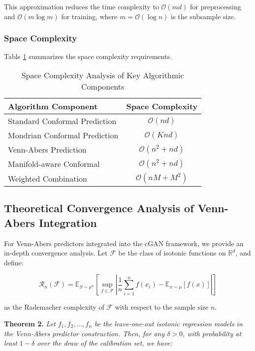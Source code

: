 \documentclass{article}
\theoremstyle{plain}
\theoremstyle{definition}
\theoremstyle{remark}
\begin{document}
This approximation reduces the time complexity to $\mathcal{O}(md)$ for preprocessing and $\mathcal{O}(m \log m)$ for training, where $m = \mathcal{O}(\log n)$ is the subsample size.

\subsubsection{Space Complexity}

Table \ref{tab:space_complexity} summarizes the space complexity requirements.

\begin{table}[htbp]
\centering
\caption{Space Complexity Analysis of Key Algorithmic Components}
\label{tab:space_complexity}
\begin{tabular}{|l|c|}
\hline
\textbf{Algorithm Component} & \textbf{Space Complexity} \\
\hline
Standard Conformal Prediction & $\mathcal{O}(nd)$ \\
\hline
Mondrian Conformal Prediction & $\mathcal{O}(Knd)$ \\
\hline
Venn-Abers Prediction & $\mathcal{O}(n^2 + nd)$ \\
\hline
Manifold-aware Conformal & $\mathcal{O}(n^2 + nd)$ \\
\hline
Weighted Combination & $\mathcal{O}(nM + M^2)$ \\
\hline
\end{tabular}
\end{table}

\subsection{Theoretical Convergence Analysis of Venn-Abers Integration}

For Venn-Abers predictors integrated into the cGAN framework, we provide an in-depth convergence analysis. Let $\mathcal{F}$ be the class of isotonic functions on $\mathbb{R}^d$, and define:

\begin{equation}
\mathcal{R}_n(\mathcal{F}) = \mathbb{E}_{S \sim \mu^n}\left[ \sup_{f \in \mathcal{F}} \left| \frac{1}{n} \sum_{i=1}^n f(x_i) - \mathbb{E}_{x \sim \mu}[f(x)] \right| \right]
\end{equation}

as the Rademacher complexity of $\mathcal{F}$ with respect to the sample size $n$.

\textbf{Theorem 2.} \textit{Let $f_1, f_2, \ldots, f_n$ be the leave-one-out isotonic regression models in the Venn-Abers predictor construction. Then, for any $\delta > 0$, with probability at least $1-\delta$ over the draw of the calibration set, we have:}
\end{document}
